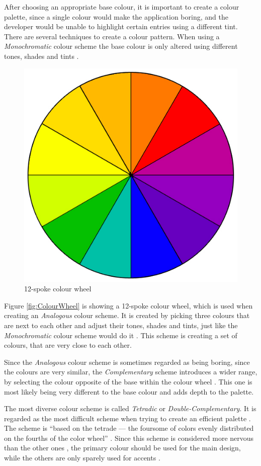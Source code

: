 After choosing an appropriate base colour, it is important to create a colour palette, since a single colour would make the application boring, and the developer would be unable to highlight certain entries using a different tint. There are several techniques to create a colour pattern. When using a \emph{Monochromatic} colour scheme the base colour is only altered using different tones, shades and tints \cite{Chapman:2010ab}. 

\begin{figure}[h]
  	\centering
  	\includegraphics[width=0.5\linewidth]{./images/colorwheel.jpg}
  	\caption[12-spoke colour wheel, retrieved from \cite{Chapman:2010ab}]{12-spoke colour wheel}
	\label{fig:ColourWheel}
\end{figure}

Figure \vref{fig:ColourWheel} is showing a 12-spoke colour wheel, which is used when creating an \emph{Analogous} colour scheme. It is created by picking three colours that are next to each other and adjust their tones, shades and tints, just like the \emph{Monochromatic} colour scheme would do it \cite{Chapman:2010ab}. This scheme is creating a set of colours, that are very close to each other.

Since the \emph{Analogous} colour scheme is sometimes regarded as being boring, since the colours are very similar, the \emph{Complementary} scheme introduces a wider range, by selecting the colour opposite of the base within the colour wheel \cite{Chapman:2010ab}. This one is most likely being very different to the base colour and adds depth to the palette.

The most diverse colour scheme is called \emph{Tetradic} or \emph{Double-Complementary}. It is regarded as the most difficult scheme when trying to create an efficient palette \cite{Chapman:2010ab}. The scheme is \enquote{based on the tetrade — the foursome of colors evenly distributed on the fourths of the color wheel} \cite{Stanicek:2011aa}. Since this scheme is considered more nervous than the other ones \cite{Stanicek:2011aa}, the primary colour should be used for the main design, while the others are only sparely used for accents \cite{Chapman:2010ab}.

